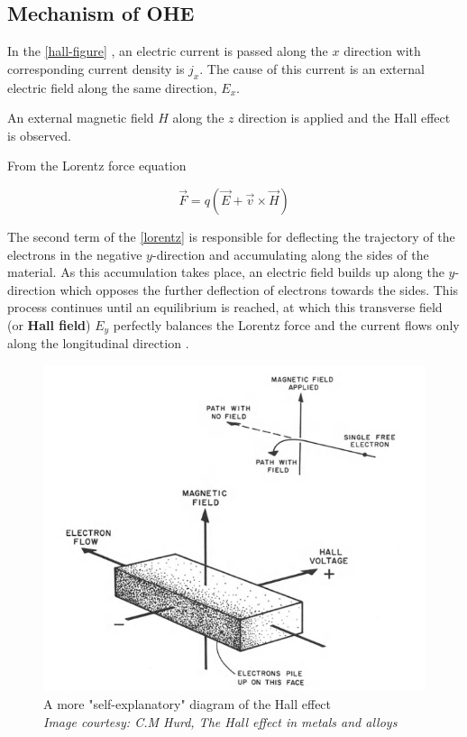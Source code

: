 \subsection{Mechanism of OHE}

In the \cref{hall-figure} , an electric current is passed along the $ x $ direction with corresponding current density is $ j_x $.
The cause of this current is an external electric field along the same direction, $ E_x $.

An external magnetic field $ H $ along the $ z $ direction is applied and the Hall effect is observed.

From the Lorentz force equation

\begin{equation} \label{lorentz}
    \vec{F} = q (\vec{E} + \vec{v} \times \vec{H})
\end{equation}

The second term of the \cref{lorentz} is responsible for deflecting the trajectory of the electrons in the negative $ y $-direction and accumulating along the sides of the material.
As this accumulation takes place, an electric field builds up along the $ y $-direction which opposes the further deflection of electrons towards the sides.
This process continues until an equilibrium is reached, at which this transverse field (or \textbf{Hall field}) $ E_y $ perfectly balances the Lorentz force and the current flows only along the longitudinal direction \cite{ashcroft1976solid}.

\begin{figure}[h!]
    \centering
    \includegraphics[width=\columnwidth]{hall-effect-hurd.png}
    \caption{A more "self-explanatory" diagram of the Hall effect\\ \textit{Image courtesy: C.M Hurd, The Hall effect in metals and alloys}}
\end{figure}

